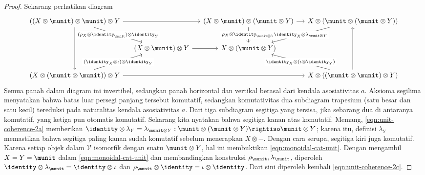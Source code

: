 \begin{proof}
	Sekarang perhatikan diagram
	\begin{equation}\label{eqn:coherence-aux0} \begin{tikzcd}[column sep=small, row sep=2.25em]
		((X \otimes \munit) \otimes \munit) \otimes Y \arrow[dd] \arrow[rr] \arrow[rd, "{(\rho_X \otimes \identity_\munit) \otimes \identity_Y}" description] & & (X \otimes \munit) \otimes (\munit \otimes Y) \arrow[r] \arrow[d, "{\rho_X \otimes \identity_{\munit \otimes Y}}" description] & X \otimes (\munit \otimes (\munit \otimes Y)) \arrow[ld, "{\identity_X \otimes \lambda_{\munit \otimes Y}}" description] \\
		& (X \otimes \munit) \otimes Y \arrow[r] & X \otimes (\munit \otimes Y) & \\
		(X \otimes (\munit \otimes \munit)) \otimes Y \arrow[rrr] \arrow[ru, "{(\identity_X \otimes \iota) \otimes \identity_Y}" description] & & & X \otimes ((\munit \otimes \munit) \otimes Y) \arrow[uu] \arrow[lu, "{\identity_X \otimes (\iota \otimes \identity_Y)}" description]
	  \end{tikzcd} \end{equation}
	Semua panah dalam diagram ini invertibel, sedangkan panah horizontal dan vertikal berasal dari kendala asosiativitas $a$. Aksioma segilima menyatakan bahwa batas luar persegi panjang tersebut komutatif, sedangkan komutativitas dua subdiagram trapesium (satu besar dan satu kecil) tereduksi pada naturalitas kendala asosiativitas $a$. Dari tiga subdiagram segitiga yang tersisa, jika sebarang dua di antaranya komutatif, yang ketiga pun otomatis komutatif. Sekarang kita nyatakan bahwa segitiga kanan atas komutatif. Memang, \eqref{eqn:unit-coherence-2a} memberikan $\identity \otimes \lambda_Y = \lambda_{\munit \otimes Y}: \munit \otimes (\munit \otimes Y) \rightiso \munit \otimes Y$; karena itu, definisi $\lambda_Y$ memastikan bahwa segitiga paling kanan sudah komutatif sebelum menerapkan $X \otimes -$. Dengan cara serupa, segitiga kiri juga komutatif. Karena setiap objek dalam $\mathcal{V}$ isomorfik dengan suatu $\munit \otimes Y$, hal ini membuktikan \eqref{eqn:monoidal-cat-unit}. Dengan mengambil $X=Y=\munit$ dalam \eqref{eqn:monoidal-cat-unit} dan membandingkan konstruksi $\rho_\munit, \lambda_\munit$, diperoleh $\identity \otimes \lambda_{\munit} = \identity \otimes \iota$ dan $\rho_{\munit} \otimes \identity = \iota \otimes \identity$. Dari sini diperoleh kembali \eqref{eqn:unit-coherence-2c}.


\end{proof}

